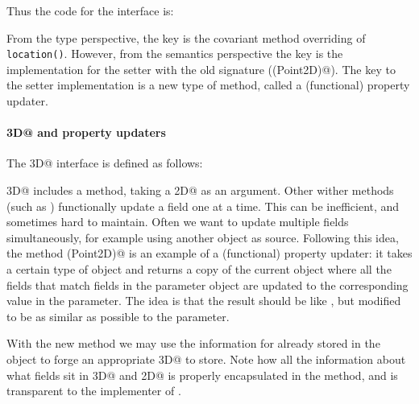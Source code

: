 \noindent Thus the code for the \Q@Bird@ interface is:



\noindent From the type perspective, the key is the covariant method
overriding of \texttt{location()}. However, from the semantics
perspective the key is the implementation for the setter with the old
signature (\Q@location(Point2D)@). The key to the setter
implementation is a new type of \Q@with@ method, called
 a (functional) property updater.

\paragraph{\Q@Point3D@ and property updaters}
The \Q@Point3D@ interface is defined as follows:


\noindent \Q@Point3D@ includes a
\Q@with@ method, taking a \Q@Point2D@ as an argument.
Other wither methods (such as \Q@withX@) functionally update a field one at a time.  This can be
inefficient, and sometimes hard to maintain.  Often we want to update multiple
fields simultaneously, for example using another object as source.  Following
this idea, the method \Q@with(Point2D)@ is an example of a (functional)
property updater: it takes a certain type of object and returns a copy of the
current object where all the fields that match fields in the parameter
object are updated to the corresponding value in the parameter. The idea is that
the result should be like \Q@this@, but modified to be as similar as possible to the parameter.

With the new \Q@with@ method we may use the information for
\Q@z@ already stored in the object to forge an appropriate \Q@Point3D@
to store. Note how all the information about what fields sit in
\Q@Point3D@ and \Q@Point2D@ is properly encapsulated in the
\Q@with@ method, and is transparent to the implementer of \Q@Bird@.

